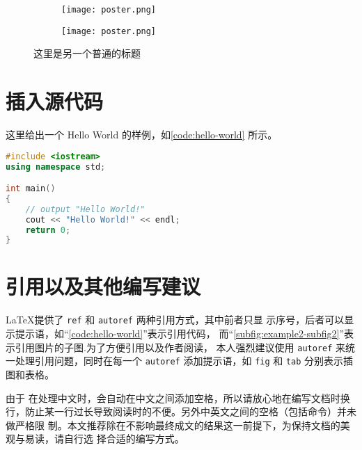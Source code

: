 \documentclass[lang=chs, degree=phd, blindreview=false, winfonts=true]{yanputhesis}
\begin{document}
\begin{figure}[htb]
    \centering
    \begin{minipage}[t]{0.96\textwidth}
        \centering
        \begin{subfigure}[t]{0.47\textwidth}
            \centering
            \texttt{[image: poster.png]}
            \caption{\label{subfig:example2-subfig1}}
        \end{subfigure}
        \begin{subfigure}[t]{0.47\textwidth}
            \centering
            \texttt{[image: poster.png]}
            \caption{\label{subfig:example2-subfig2}}
        \end{subfigure}
    \end{minipage}
    \caption{这里是另一个普通的标题}
    \label{fig:example2}
\end{figure}

\section{插入源代码}

这里给出一个 Hello World 的样例，如\autoref{code:hello-world} 所示。

\begin{lstlisting}[language={C++}, label={code:hello-world},
    caption={Hello World.cpp}]
#include <iostream>
using namespace std;

int main()
{
    // output "Hello World!"
    cout << "Hello World!" << endl;
    return 0;
}
\end{lstlisting}

\section{引用以及其他编写建议}

\LaTeX 提供了 \lstinline`ref` 和 \lstinline`autoref` 两种引用方式，其中前者只显
示序号，后者可以显示提示语，如“\autoref{code:hello-world}”表示引用代码，
而“\autoref{subfig:example2-subfig2}”表示引用图片的子图.为了方便引用以及作者阅读，
本人强烈建议使用 \lstinline`autoref` 来统一处理引用问题，同时在每一个
\lstinline`autoref` 添加提示语，如 \lstinline`fig` 和 \lstinline`tab` 分别表示插
图和表格。

由于 \XeLaTeX 在处理中文时，会自动在中文之间添加空格，所以请放心地在编写文档时换
行，防止某一行过长导致阅读时的不便。另外中英文之间的空格（包括命令）并未做严格限
制。本文推荐除在不影响最终成文的结果这一前提下，为保持文档的美观与易读，请自行选
择合适的编写方式。
\end{document}
